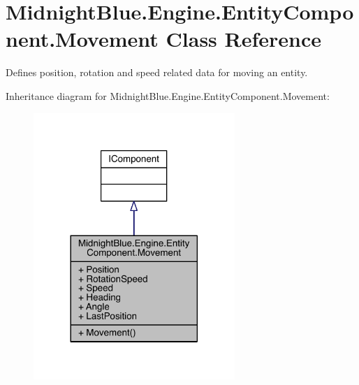 \hypertarget{class_midnight_blue_1_1_engine_1_1_entity_component_1_1_movement}{}\section{Midnight\+Blue.\+Engine.\+Entity\+Component.\+Movement Class Reference}
\label{class_midnight_blue_1_1_engine_1_1_entity_component_1_1_movement}


Defines position, rotation and speed related data for moving an entity.  




Inheritance diagram for Midnight\+Blue.\+Engine.\+Entity\+Component.\+Movement\+:
\nopagebreak
\begin{figure}[H]
\begin{center}
\leavevmode
\includegraphics[width=216pt]{class_midnight_blue_1_1_engine_1_1_entity_component_1_1_movement__inherit__graph}
\end{center}
\end{figure}


